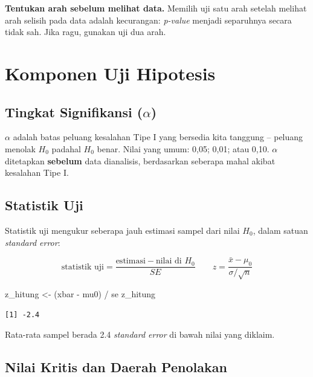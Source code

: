 \documentclass[
  indonesian,
  letterpaper,
]{book}
\newenvironment{Shaded}{\begin{snugshade}}{\end{snugshade}}
\newcommand{\NormalTok}[1]{\textcolor[rgb]{0.00,0.23,0.31}{#1}}
\newcommand{\OtherTok}[1]{\textcolor[rgb]{0.00,0.23,0.31}{#1}}
\newcommand{\SpecialCharTok}[1]{\textcolor[rgb]{0.37,0.37,0.37}{#1}}
\begin{document}
\textbf{Tentukan arah sebelum melihat data.} Memilih uji satu arah
setelah melihat arah selisih pada data adalah kecurangan: \emph{p-value}
menjadi separuhnya secara tidak sah. Jika ragu, gunakan uji dua arah.


\chapter{Komponen Uji Hipotesis}\label{komponen-uji-hipotesis}

\section{\texorpdfstring{Tingkat Signifikansi
(\(\alpha\))}{Tingkat Signifikansi (\textbackslash alpha)}}\label{tingkat-signifikansi-alpha}

\(\alpha\) adalah batas peluang kesalahan Tipe I yang bersedia kita
tanggung -- peluang menolak \(H_0\) padahal \(H_0\) benar. Nilai yang
umum: 0,05; 0,01; atau 0,10. \(\alpha\) ditetapkan \textbf{sebelum} data
dianalisis, berdasarkan seberapa mahal akibat kesalahan Tipe I.

\section{Statistik Uji}\label{statistik-uji}

Statistik uji mengukur seberapa jauh estimasi sampel dari nilai \(H_0\),
dalam satuan \emph{standard error}:

\[\text{statistik uji} = \frac{\text{estimasi} - \text{nilai di } H_0}{SE} \qquad z = \frac{\bar{x} - \mu_0}{\sigma/\sqrt{n}}\]

\begin{Shaded}
\begin{Highlighting}[]
\NormalTok{z\_hitung }\OtherTok{\textless{}{-}}\NormalTok{ (xbar }\SpecialCharTok{{-}}\NormalTok{ mu0) }\SpecialCharTok{/}\NormalTok{ se}
\NormalTok{z\_hitung}
\end{Highlighting}
\end{Shaded}

\begin{verbatim}
[1] -2.4
\end{verbatim}

Rata-rata sampel berada 2.4 \emph{standard error} di bawah nilai yang
diklaim.

\section{Nilai Kritis dan Daerah
Penolakan}\label{nilai-kritis-dan-daerah-penolakan}
\end{document}
